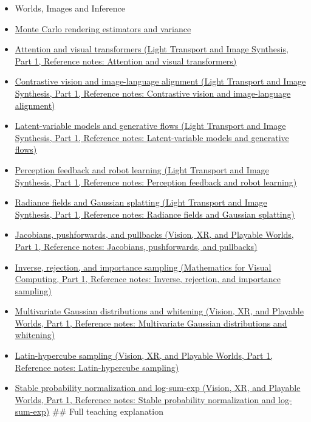 \begin{itemize}
\item
  {Worlds, Images and Inference}
\item
  \hyperref[appendix-031e02bf28af]{Monte Carlo rendering estimators and variance}
\item
  \href{../04-Light-Transport-and-Image-Synthesis-P01/main.pdf\#appendix-a9d5dfdd164a}{Attention and visual transformers (Light Transport and Image Synthesis, Part 1, Reference notes: Attention and visual transformers)}
\item
  \href{../04-Light-Transport-and-Image-Synthesis-P01/main.pdf\#appendix-772f1fd96148}{Contrastive vision and image-language alignment (Light Transport and Image Synthesis, Part 1, Reference notes: Contrastive vision and image-language alignment)}
\item
  \href{../04-Light-Transport-and-Image-Synthesis-P01/main.pdf\#appendix-2c568f05ee34}{Latent-variable models and generative flows (Light Transport and Image Synthesis, Part 1, Reference notes: Latent-variable models and generative flows)}
\item
  \href{../04-Light-Transport-and-Image-Synthesis-P01/main.pdf\#appendix-b0c42da325f1}{Perception feedback and robot learning (Light Transport and Image Synthesis, Part 1, Reference notes: Perception feedback and robot learning)}
\item
  \href{../04-Light-Transport-and-Image-Synthesis-P01/main.pdf\#appendix-c5b332e400e7}{Radiance fields and Gaussian splatting (Light Transport and Image Synthesis, Part 1, Reference notes: Radiance fields and Gaussian splatting)}
\item
  \href{../07-Vision-XR-and-Playable-Worlds-P01/main.pdf\#appendix-d8a7ddb675eb}{Jacobians, pushforwards, and pullbacks (Vision, XR, and Playable Worlds, Part 1, Reference notes: Jacobians, pushforwards, and pullbacks)}
\item
  \href{../02-Mathematics-for-Visual-Computing-P01/main.pdf\#appendix-8d863ed954d0}{Inverse, rejection, and importance sampling (Mathematics for Visual Computing, Part 1, Reference notes: Inverse, rejection, and importance sampling)}
\item
  \href{../07-Vision-XR-and-Playable-Worlds-P01/main.pdf\#appendix-12bbe185dbe5}{Multivariate Gaussian distributions and whitening (Vision, XR, and Playable Worlds, Part 1, Reference notes: Multivariate Gaussian distributions and whitening)}
\item
  \href{../07-Vision-XR-and-Playable-Worlds-P01/main.pdf\#appendix-1c5e85693a06}{Latin-hypercube sampling (Vision, XR, and Playable Worlds, Part 1, Reference notes: Latin-hypercube sampling)}
\item
  \href{../07-Vision-XR-and-Playable-Worlds-P01/main.pdf\#appendix-d580b422240f}{Stable probability normalization and log-sum-exp (Vision, XR, and Playable Worlds, Part 1, Reference notes: Stable probability normalization and log-sum-exp)} \#\# Full teaching explanation
\end{itemize}

